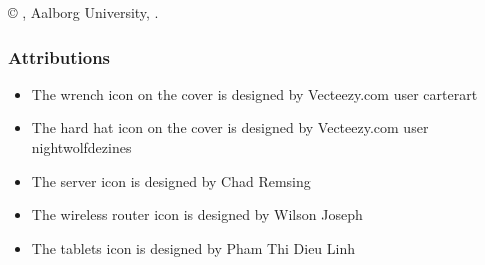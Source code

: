 \hypersetup{pageanchor=false} %
\thispagestyle{empty}
{\small
\strut\vfill
\noindent \copyright{} \groupname{}, Aalborg University, \MakeLowercase{\projectperiod{}}.\par
\vspace{0.3cm}
\subsubsection*{Attributions}
\begin{itemize}
  \item The wrench icon on the cover is designed by Vecteezy.com user carterart
  \item The hard hat icon on the cover is designed by Vecteezy.com user nightwolfdezines
  \item The server icon  is designed by Chad Remsing
  \item The wireless router icon  is designed by Wilson Joseph
  \item The tablets icon  is designed by Pham Thi Dieu Linh
\end{itemize}
}
\clearpage
\hypersetup{pageanchor=true} %
